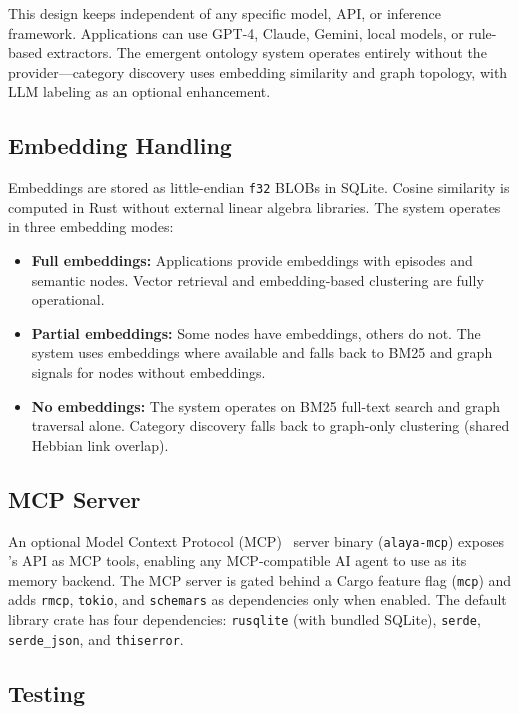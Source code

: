 This design keeps \alaya{} independent of any specific model, API, or
inference framework. Applications can use GPT-4, Claude, Gemini, local
models, or rule-based extractors. The emergent ontology system operates
entirely without the provider---category discovery uses embedding similarity
and graph topology, with LLM labeling as an optional enhancement.

\subsection{Embedding Handling}

Embeddings are stored as little-endian \texttt{f32} BLOBs in SQLite.
Cosine similarity is computed in Rust without external linear algebra
libraries. The system operates in three embedding modes:

\begin{itemize}[nosep]
    \item \textbf{Full embeddings:} Applications provide embeddings with
    episodes and semantic nodes. Vector retrieval and embedding-based
    clustering are fully operational.
    \item \textbf{Partial embeddings:} Some nodes have embeddings, others do
    not. The system uses embeddings where available and falls back to BM25
    and graph signals for nodes without embeddings.
    \item \textbf{No embeddings:} The system operates on BM25 full-text
    search and graph traversal alone. Category discovery falls back to
    graph-only clustering (shared Hebbian link overlap).
\end{itemize}

\subsection{MCP Server}

An optional Model Context Protocol (MCP)~\cite{anthropic2024mcp} server
binary (\texttt{alaya-mcp}) exposes \alaya{}'s API as MCP tools, enabling
any MCP-compatible AI agent to use \alaya{} as its memory backend. The MCP
server is gated behind a Cargo feature flag (\texttt{mcp}) and adds
\texttt{rmcp}, \texttt{tokio}, and \texttt{schemars} as dependencies only
when enabled. The default library crate has four dependencies:
\texttt{rusqlite} (with bundled SQLite), \texttt{serde},
\texttt{serde\_json}, and \texttt{thiserror}.

\subsection{Testing}

